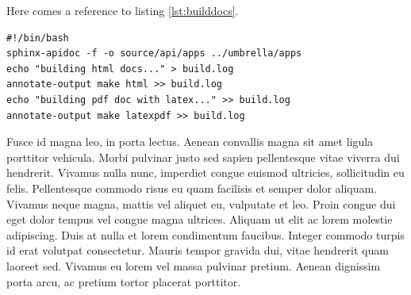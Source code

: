 \begin{figure}[H]
\begin{center}
	\label{fig:api_render_to_file}
\end{center}
\end{figure}

Here comes a reference to listing \ref{lst:builddocs}.

\lstset{tabsize=2}
\begin{lstlisting}[breaklines=true,frame=single,caption={Shellscript for building the software documentation in HTML and PDF},label=lst:builddocs]
#!/bin/bash
sphinx-apidoc -f -o source/api/apps ../umbrella/apps
echo "building html docs..." > build.log
annotate-output make html >> build.log
echo "building pdf doc with latex..." >> build.log
annotate-output make latexpdf >> build.log
\end{lstlisting}

Fusce id magna leo, in porta lectus. Aenean convallis magna sit amet ligula
porttitor vehicula. Morbi pulvinar justo sed sapien pellentesque vitae viverra
dui hendrerit. Vivamus nulla nunc, imperdiet congue euismod ultricies,
sollicitudin eu felis. Pellentesque commodo risus eu quam facilisis et semper
dolor aliquam. Vivamus neque magna, mattis vel aliquet eu, vulputate et leo.
Proin congue dui eget dolor tempus vel congue magna ultrices. Aliquam ut elit
ac lorem molestie adipiscing. Duis at nulla et lorem condimentum faucibus.
Integer commodo turpis id erat volutpat consectetur. Mauris tempor gravida
dui, vitae hendrerit quam laoreet sed. Vivamus eu lorem vel massa pulvinar
pretium. Aenean dignissim porta arcu, ac pretium tortor placerat porttitor. 


